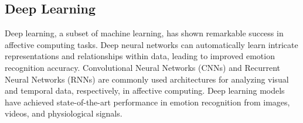 \subsection{Deep Learning}

Deep learning, a subset of machine learning, has shown remarkable success in affective computing tasks. 
Deep neural networks can automatically learn intricate representations and relationships within data, leading to improved emotion recognition accuracy.
Convolutional Neural Networks (CNNs) and Recurrent Neural Networks (RNNs) are commonly used architectures for analyzing visual and temporal data, respectively, in affective computing.
Deep learning models have achieved state-of-the-art performance in emotion recognition from images, videos, and physiological signals.